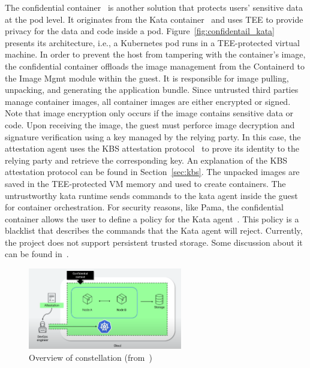 The confidential container~\cite*{confidential_kata} is another solution that protects users' sensitive data at the pod level. It originates from the Kata container~\cite*{Kata-Containers} and uses \acrshort{TEE} to provide privacy for the data and code inside a pod. Figure~\ref{fig:confidentail_kata} presents its architecture, i.e., a Kubernetes pod runs in a 
TEE-protected virtual machine. In order to prevent the host from tampering with the container's image, the confidential container offloads the image management from the Containerd\cite*{containerd} to the Image Mgmt module within the guest. It is responsible for image pulling, unpacking, and generating the 
application bundle. Since untrusted third parties manage container images, all container images are either encrypted or signed. Note that image encryption only occurs if the image contains sensitive data or code. Upon receiving the image, the guest must perforce image decryption and signature 
verification using a key managed by the relying party. In this case, the attestation agent uses the KBS attestation protocol~\cite*{kbs_Attestation_protocol} to prove its identity to the relying party and retrieve the corresponding key. An explanation of the KBS attestation protocol can be found in Section~\ref{sec:kbs}. The unpacked images are saved in 
the TEE-protected VM memory and used to create containers. The untrustworthy kata runtime sends commands to the kata agent inside the guest for container 
orchestration. For security reasons, like Pama, the confidential container allows the user to define a policy for the Kata agent~\cite*{kata_api_restriction}. This policy is a blacklist that describes the commands that the Kata agent will reject. Currently, the project does not support persistent trusted storage. 
Some discussion about it can be found in~\cite*{confidentail_kata_storage}.

\begin{figure}[htp]
    \centering
    \includegraphics[width=0.6\textwidth]{images/constellation_arch.png}
    \caption[Overview of constellation]{Overview of constellation (from~\cite*{Constellation_Always_encrypted})}
    \label{fig:constellation_arch}
\end{figure}

